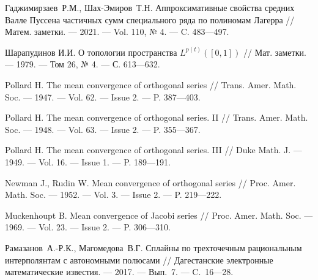 \begin{thebibliography}{11}
	
{Гаджимирзаев~Р.М., Шах-Эмиров~Т.Н.} 
Аппроксимативные свойства средних Валле Пуссена частичных сумм специального ряда по полиномам Лагерра 
//
Матем. заметки.
--- 2021.
--- Vol. 110, № 4.
--- C. 483---497.





Шарапудинов И.И. О топологии пространства $L^{p(t)}([0,1])$ // Мат. заметки. --- 1979. --- Том 26, № 4. --- С. 613---632.





 




Pollard H. The mean convergence of orthogonal series // Trans. Amer. Math. Soc.
--- 1947. --- Vol. 62. --- Issue 2. --- P. 387---403.





Pollard H. The mean convergence of orthogonal series. II // Trans. Amer. Math. Soc.
--- 1948. --- Vol. 63. --- Issue 2. --- P. 355---367.





Pollard H. The mean convergence of orthogonal series. III // Duke Math. J. --- 1949.
--- Vol. 16. --- Issue 1. --- P. 189---191.





Newman J., Rudin W. Mean convergence of orthogonal series // Proc. Amer. Math.
Soc. --- 1952. --- Vol. 3. --- Issue 2. --- P. 219---222.





Muckenhoupt B. Mean convergence of Jacobi series // Proc. Amer. Math. Soc. --- 1969.
--- Vol. 23. --- Issue 2. --- P. 306---310.





Рамазанов~А.-Р.К., Магомедова~В.Г. Сплайны по трехточечным 
рациональным интерполянтам с автономными полюсами // Дагестанские электронные
 математические известия. --- 2017. --- Вып.~7. --- C.~16---28.






\end{thebibliography}
